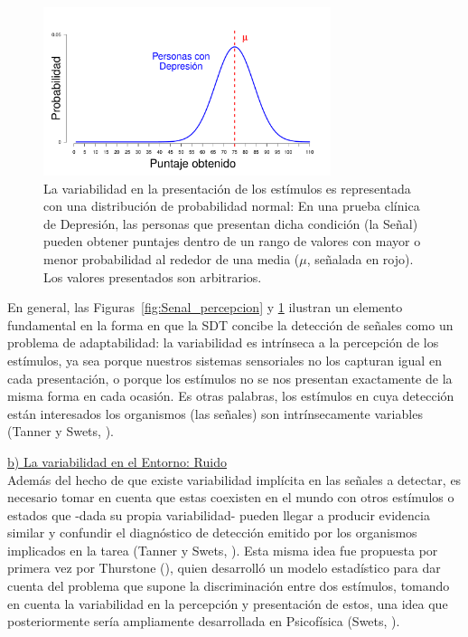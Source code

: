 \begin{figure}[h]
\centering
\includegraphics[width=0.75\textwidth]{Figures/Signal_Presentation} 
\caption[Variabilidad en la presentación de los estímulos]{La variabilidad en la presentación de los estímulos es representada con una distribución de probabilidad normal: En una prueba clínica de Depresión, las personas que presentan dicha condición (la Señal) pueden obtener puntajes dentro de un rango de valores con mayor o menor probabilidad al rededor de una media ($\mu$, señalada en rojo). Los valores presentados son arbitrarios.}
\label{fig:Senal_presentacion}
\end{figure}

En general, las Figuras~\ref{fig:Senal_percepcion} y \ref{fig:Senal_presentacion} ilustran un elemento fundamental en la forma en que la SDT concibe la detección de señales como un problema de adaptabilidad: la variabilidad es intrínseca a la percepción de los estímulos, ya sea porque nuestros sistemas sensoriales no los capturan igual en cada presentación, o porque los estímulos no se nos presentan exactamente de la misma forma en cada ocasión. Es otras palabras, los estímulos en cuya detección están interesados los organismos (las señales) son intrínsecamente variables (Tanner y Swets, \citeyear{Tanner1954}).\\

\pagebreak

    \underline{b) La variabilidad en el Entorno: Ruido}\\

Además del hecho de que existe variabilidad implícita en las señales a detectar, es necesario tomar en cuenta que estas coexisten en el mundo con otros estímulos o estados que -dada su propia variabilidad- pueden llegar a producir evidencia similar y confundir el diagnóstico de detección emitido por los organismos implicados en la tarea (Tanner y Swets, \citeyear{Tanner1954}). Esta misma idea fue propuesta por primera vez por Thurstone (\citeyear{Thurstone1927}), quien desarrolló un modelo estadístico para dar cuenta del problema que supone la discriminación entre dos estímulos, tomando en cuenta la variabilidad en la percepción y presentación de estos, una idea que posteriormente sería ampliamente desarrollada en Psicofísica (Swets, \citeyear{Swets1973}).\\

